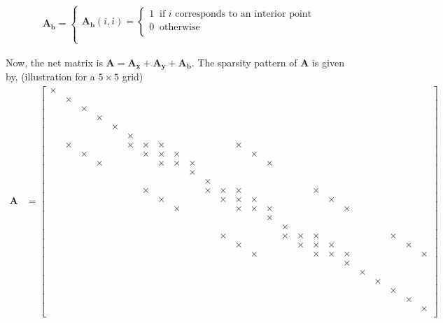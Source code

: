 \documentclass[12 pt, final]{article}
\renewcommand{\d}{\times}
\begin{document}
\begin{itemize}
\begin{itemize}
            \begin{align*}
                    \mathbf{A_b} = \begin{cases}
                    \mathbf{A_b}(i,i) =
                    \begin{cases}
                    1 \: \text{ if $i$ corresponds to an interior point}\:\\
                    0 \: \text{ otherwise}\:\\
                    \end{cases}\\
                    \end{cases}
            \end{align*}
 
            
            Now, the net matrix is $\mathbf{A} = \mathbf{A_x}+\mathbf{A_y}+\mathbf{A_b}$. The sparsity pattern of $\mathbf{A}$ is given by, (illustration for a $5\times5$ grid)
            \begin{align*}
                \mathbf{A} &= \left[\begin{smallmatrix} 
                \d\\
                & \d\\
                && \d\\
                &&& \d\\
                &&&& \d\\
                &&&&& \d\\
                & \d &&&&\d& \d &\d&&&&& \d\\
                && \d &&&&\d& \d &\d&&&&& \d\\
                &&& \d &&&&\d& \d &\d&&&&& \d\\
                &&&&&&&&& \d\\
                &&&&&&&&&& \d\\
                &&&&&& \d &&&&\d& \d &\d&&&&& \d\\
                &&&&&&& \d &&&&\d& \d &\d&&&&& \d\\
                &&&&&&&& \d &&&&\d& \d &\d&&&&& \d\\
                &&&&&&&&&&&&&& \d\\
                &&&&&&&&&&&&&&& \d\\
                &&&&&&&&&&& \d &&&&\d& \d &\d&&&&& \d\\
                &&&&&&&&&&&& \d &&&&\d& \d &\d&&&&& \d\\
                &&&&&&&&&&&&& \d &&&&\d& \d &\d&&&&& \d\\
                &&&&&&&&&&&&&&&&&&& \d\\
                &&&&&&&&&&&&&&&&&&&& \d\\
                &&&&&&&&&&&&&&&&&&&&& \d\\
                &&&&&&&&&&&&&&&&&&&&&& \d\\
                &&&&&&&&&&&&&&&&&&&&&&& \d\\
                &&&&&&&&&&&&&&&&&&&&&&&& \d\\
                \end{smallmatrix}\right]
            \end{align*}
            

\end{itemize}
\end{itemize}
\end{document}
